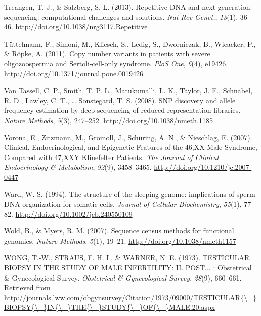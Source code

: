 \documentclass[12pt,twoside]{reedthesis}
\theoremstyle{definition}
\theoremstyle{definition}
\theoremstyle{remark}
\begin{document}
  \hypertarget{ref-Treangen2013}{}
  Treangen, T. J., \& Salzberg, S. L. (2013). Repetitive DNA and
  next-generation sequencing: computational challenges and solutions.
  \emph{Nat Rev Genet.}, \emph{13}(1), 36--46.
  \url{http://doi.org/10.1038/nrg3117.Repetitive}
  
  \hypertarget{ref-Tuttelmann2011}{}
  Tüttelmann, F., Simoni, M., Kliesch, S., Ledig, S., Dworniczak, B.,
  Wieacker, P., \& Röpke, A. (2011). Copy number variants in patients with
  severe oligozoospermia and Sertoli-cell-only syndrome. \emph{PloS One},
  \emph{6}(4), e19426. \url{http://doi.org/10.1371/journal.pone.0019426}
  
  \hypertarget{ref-VanTassell2008}{}
  Van Tassell, C. P., Smith, T. P. L., Matukumalli, L. K., Taylor, J. F.,
  Schnabel, R. D., Lawley, C. T., \ldots{} Sonstegard, T. S. (2008). SNP
  discovery and allele frequency estimation by deep sequencing of reduced
  representation libraries. \emph{Nature Methods}, \emph{5}(3), 247--252.
  \url{http://doi.org/10.1038/nmeth.1185}
  
  \hypertarget{ref-Vorona2007}{}
  Vorona, E., Zitzmann, M., Gromoll, J., Schüring, A. N., \& Nieschlag, E.
  (2007). Clinical, Endocrinological, and Epigenetic Features of the 46,XX
  Male Syndrome, Compared with 47,XXY Klinefelter Patients. \emph{The
  Journal of Clinical Endocrinology \& Metabolism}, \emph{92}(9),
  3458--3465. \url{http://doi.org/10.1210/jc.2007-0447}
  
  \hypertarget{ref-Ward1994}{}
  Ward, W. S. (1994). The structure of the sleeping genome: implications
  of sperm DNA organization for somatic cells. \emph{Journal of Cellular
  Biochemistry}, \emph{55}(1), 77--82.
  \url{http://doi.org/10.1002/jcb.240550109}
  
  \hypertarget{ref-Wold2007}{}
  Wold, B., \& Myers, R. M. (2007). Sequence census methods for functional
  genomics. \emph{Nature Methods}, \emph{5}(1), 19--21.
  \url{http://doi.org/10.1038/nmeth1157}
  
  \hypertarget{ref-WONG1973}{}
  WONG, T.-W., STRAUS, F. H. I., \& WARNER, N. E. (1973). TESTICULAR
  BIOPSY IN THE STUDY OF MALE INFERTILITY: II. POST... : Obstetrical \&
  Gynecological Survey. \emph{Obstetrical \& Gynecological Survey},
  \emph{28}(9), 660--661. Retrieved from
  \href{http://journals.lww.com/obgynsurvey/Citation/1973/09000/TESTICULAR\%7B/_\%7DBIOPSY\%7B/_\%7DIN\%7B/_\%7DTHE\%7B/_\%7DSTUDY\%7B/_\%7DOF\%7B/_\%7DMALE.20.aspx}{http://journals.lww.com/obgynsurvey/Citation/1973/09000/TESTICULAR\{\textbackslash{}\_\}BIOPSY\{\textbackslash{}\_\}IN\{\textbackslash{}\_\}THE\{\textbackslash{}\_\}STUDY\{\textbackslash{}\_\}OF\{\textbackslash{}\_\}MALE.20.aspx}
  
\end{document}
